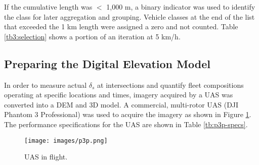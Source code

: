 If the cumulative length was $<$ 1,000 m, a binary indicator was used to identify the class for later aggregation and grouping.  Vehicle classes at the end of the list that exceeded the 1 km length were assigned a zero and not counted.  Table \ref{tb3:selection} shows a portion of an iteration at 5 km/h. 

\begin{table}[H]
\centering
\caption[Vehicle density sample]{Sample of an iteration showing vehicle class and road space selection for speed = 5 km/h.}
\label{tb3:selection}
\end{table}

\subsection{Preparing the Digital Elevation Model}

In order to measure actual $\delta_{s}$ at intersections and quantify fleet compositions operating at specific locations and times, imagery acquired by a UAS was converted into a DEM and 3D model. A commercial, multi-rotor UAS (DJI Phantom 3 Professional) was used to acquire the imagery as shown in Figure \ref{fig:p3p}. The performance specifications for the UAS are shown in Table \ref{tb:p3p-specs}.

%
\begin{figure}[H]
\centering
\texttt{[image: images/p3p.png]}  %
\caption{UAS in flight.}
\label{fig:p3p}
\end{figure}
%

